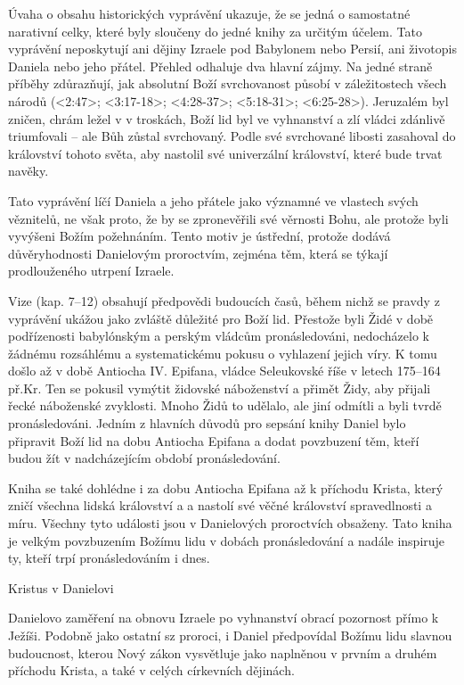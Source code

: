 Úvaha o obsahu historických vyprávění ukazuje, že se jedná o samostatné narativní celky,
které byly sloučeny do jedné knihy za určitým účelem.
Tato vyprávění neposkytují ani dějiny Izraele pod Babylonem nebo Persií, ani životopis Daniela nebo jeho přátel.
Přehled odhaluje dva hlavní zájmy.
Na jedné straně příběhy zdůrazňují, jak absolutní Boží svrchovanost působí v záležitostech
všech národů (<2:47>; <3:17-18>; <4:28-37>; <5:18-31>; <6:25-28>).
Jeruzalém byl zničen, chrám ležel v v troskách, Boží lid byl ve vyhnanství a zlí vládci zdánlivě triumfovali -- ale Bůh zůstal svrchovaný.
Podle své svrchované libosti zasahoval do království tohoto světa, aby nastolil své
univerzální království, které bude trvat navěky.

Tato vyprávění líčí Daniela a jeho přátele jako významné ve vlastech svých věznitelů, ne však
proto, že by se zpronevěřili své věrnosti Bohu, ale protože byli vyvýšeni Božím požehnáním.
Tento motiv je ústřední, protože dodává důvěryhodnosti Danielovým proroctvím, zejména těm, která se týkají
prodlouženého utrpení Izraele.

 Vize (kap. 7--12) obsahují předpovědi budoucích časů, během nichž se pravdy z vyprávění ukážou jako zvláště důležité pro Boží lid.
 Přestože byli Židé v době  podřízenosti babylónským a perským vládcům pronásledováni, 
nedocházelo k žádnému rozsáhlému a systematickému pokusu o vyhlazení jejich víry.
K tomu došlo až v době Antiocha IV. Epifana, vládce Seleukovské říše v letech 175--164 př.Kr.
Ten se pokusil vymýtit židovské náboženství a přimět Židy, aby  přijali řecké náboženské zvyklosti.
Mnoho Židů to udělalo, ale jiní odmítli a byli tvrdě pronásledováni.
Jedním z hlavních důvodů pro sepsání knihy Daniel bylo připravit Boží lid na dobu Antiocha Epifana a dodat povzbuzení těm, kteří  budou žít
v nadcházejícím období pronásledování.

Kniha se také dohlédne i za dobu Antiocha Epifana až k příchodu Krista, který zničí všechna lidská království a
a nastolí své věčné království spravedlnosti a míru.
Všechny tyto události jsou  v Danielových proroctvích obsaženy.
Tato kniha je velkým povzbuzením Božímu lidu v dobách pronásledování a nadále inspiruje ty, kteří trpí pronásledováním i dnes.


Kristus v Danielovi

Danielovo zaměření na obnovu Izraele po vyhnanství obrací pozornost  přímo k Ježíši.
Podobně jako ostatní sz proroci, i Daniel předpovídal Božímu lidu slavnou budoucnost, kterou Nový zákon vysvětluje jako
naplněnou v prvním a druhém příchodu Krista, a také v celých církevních dějinách.

